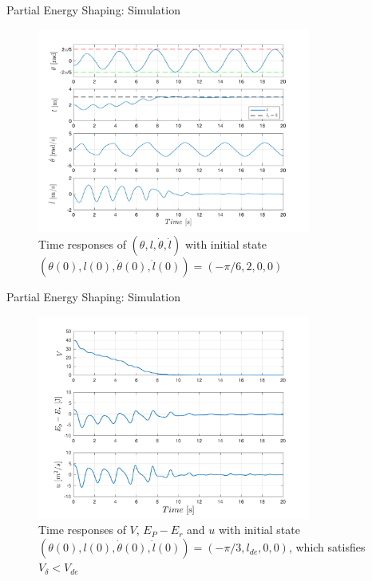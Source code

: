 \documentclass[10pt]{beamer}
\begin{document}
  \begin{frame}{Partial Energy Shaping: Simulation}
    \begin{figure}
      \caption*{Time responses of $(\theta, l, \dot{\theta}, \dot{l})$ with 
        initial state $(\theta(0), l(0), \dot{\theta}(0), \dot{l}(0))=
        (-\pi/6, 2, 0, 0)$}
      \vspace{-0.3cm}
      \includegraphics[width=0.8\textwidth]{images/partial_2.pdf}
    \end{figure}
  \end{frame}

  \begin{frame}{Partial Energy Shaping: Simulation}
    \begin{figure}
      \caption*{Time responses of $V$, $E_P-E_r$ and $u$ with initial state 
        $(\theta(0), l(0), \dot{\theta}(0), \dot{l}(0))=(-\pi/3, l_{de}, 0,
        0)$, which satisfies $V_\delta < V_{de}$}
      \vspace{-0.3cm}
      \includegraphics[width=0.8\textwidth]{images/partial_1b.pdf}
    \end{figure}
  \end{frame}
\end{document}
